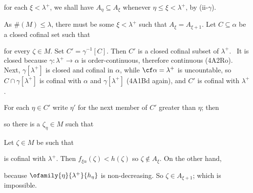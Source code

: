 {

\noindent for each $\xi<\lambda^+$, we shall have
$A_{\eta}\subseteq A_{\xi}$ whenever
$\eta\le\xi<\lambda^+$, by (ii-$\gamma$).

\medskip

 As $\#(M)\le\lambda$, there must be some
$\xi<\lambda^+$ such that $A_{\xi}=A_{\xi+1}$.   Let
$C\subseteq\alpha$ be a closed cofinal set such that


\noindent for every $\zeta\in M$.
Set $C'=\gamma^{-1}[C]$.   Then $C'$ is a closed cofinal subset of
$\lambda^+$.   \Prf\ It is closed because $\gamma:\lambda^+\to\alpha$ is
order-continuous, therefore continuous (4A2Ro).   Next, $\gamma[\lambda^+]$
is closed and cofinal in
$\alpha$, while $\cf\alpha=\lambda^+$ is uncountable, so
$C\cap\gamma[\lambda^+]$ is cofinal with $\alpha$ and $\gamma[\lambda^+]$
(4A1Bd again), and $C'$ is cofinal with $\lambda^+$.\ \QeD\

For each $\eta\in C'$ write $\eta'$ for the next member of $C'$
greater than $\eta$;  then



\noindent so there is a $\zeta_{\eta}\in M$ such that


\noindent Let $\zeta\in M$ be such that


\noindent is cofinal with $\lambda^+$.
Then $f_{\xi\alpha}(\zeta)<h(\zeta)$ so
$\zeta\notin A_{\xi}$.   On the other hand,


\noindent because $\ofamily{\eta}{\lambda^+}{h_{\eta}}$ is non-decreasing.
So $\zeta\in A_{\xi+1}$;  which is impossible.\ \Bang

}
